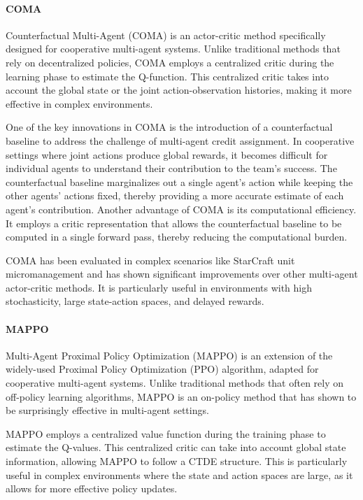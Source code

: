 \paragraph*{COMA}
Counterfactual Multi-Agent (COMA) is an actor-critic method specifically designed for cooperative multi-agent systems.
 Unlike traditional methods that rely on decentralized policies,
 COMA employs a centralized critic during the learning phase to estimate the Q-function. 
 This centralized critic takes into account the global state or the joint action-observation histories, 
 making it more effective in complex environments.

One of the key innovations in COMA is the introduction of a counterfactual baseline to address the challenge of multi-agent credit assignment. 
 In cooperative settings where joint actions produce global rewards, 
 it becomes difficult for individual agents to understand their contribution to the team's success. 
 The counterfactual baseline marginalizes out a single agent's action while keeping the other agents' actions fixed, 
 thereby providing a more accurate estimate of each agent's contribution.
Another advantage of COMA is its computational efficiency.
 It employs a critic representation that allows the counterfactual baseline to be computed in a single forward pass, 
 thereby reducing the computational burden.

COMA has been evaluated in complex scenarios like StarCraft unit micromanagement and has shown significant improvements over other multi-agent actor-critic methods. 
 It is particularly useful in environments with high stochasticity, 
 large state-action spaces, and delayed rewards.

\paragraph*{MAPPO}
Multi-Agent Proximal Policy Optimization (MAPPO) 
 is an extension of the widely-used Proximal Policy Optimization (PPO) algorithm, 
 adapted for cooperative multi-agent systems. 
 Unlike traditional methods that often rely on off-policy learning algorithms, 
 MAPPO is an on-policy method that has shown to be surprisingly effective in multi-agent settings.

MAPPO employs a centralized value function during the training phase to estimate the Q-values.
%
 This centralized critic can take into account global state information, 
 allowing MAPPO to follow a CTDE structure. 
%
 This is particularly useful in complex environments where the state and action spaces are large, 
 as it allows for more effective policy updates.

